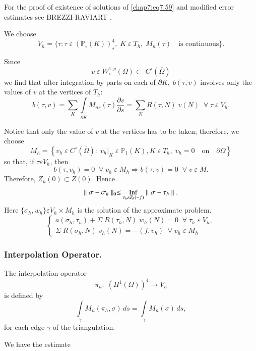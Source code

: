 For the proof of existence of solutions of \eqref{chap7:eq7.59} and
modified error estimates see BREZZI-RAVIART \cite{key7}.

We choose 
$$
V_h=\{\tau:\tau\;\varepsilon \;(\mathbb{P}_\circ(K))_s^4,\;K\;
\varepsilon \;T_h,\;M_n(\tau)\quad\text{is continuous}\}.
$$

Since
$$
v\;\varepsilon \;W_\circ^{1,p}(\Omega)\subset
\;C^\circ(\overline{\Omega})
$$
we find that after integration by parts on each of $\partial
K,\;b(\tau,v)$ involves only the values of $v$ at the vertices of
$T_h$:
\begin{equation*}\label{chap7:eq7.59b}
b(\tau,v)=\sum\limits_K\int\limits_{\partial K}M_{ns}(\tau)
\frac{\partial v}{\partial s}=\sum\limits_NR(\tau,N)\;v(N)\; \; \forall
\;\tau \;\varepsilon \;V_h.\tag{7.59b}
\end{equation*}

Notice that only the value of $v$ at the vertices has to be taken;
therefore, we choose
$$
M_h=\left\{v_h\;\varepsilon \;C^\circ(\overline{\Omega}):\;v_h|_K\;
\varepsilon \;\mathbb{P}_1(K),K\;\varepsilon \;T_h,\;v_h=0\quad
\text{on}\quad\partial\Omega\right\}
$$
so that, if $\tau \varepsilon V_h$, then 
$$
b(\tau,v_h)=0 \; \;\forall \;v_h\;\varepsilon \;M_h\Rightarrow b(\tau,v)=0
\; \;\forall \;v\;\varepsilon \;M.
$$
Therefore, $Z_h(0)\subset Z(0)$. Hence 
$$
\parallel\sigma -\sigma_h\parallel_0\leq \underset{\tau_h\varepsilon
Z_h(-f)}{\operatorname{Inf}}\parallel\sigma -\tau_h\parallel.
$$
Here $\{\sigma_h,w_h\}\varepsilon V_h\times M_h$ is the solution of
the approximate problem. 
\begin{equation}\label{chap7:eq7.60}
\begin{cases}
a(\sigma_h,\tau_h)+\Sigma \;R(\tau_h,N)\;w_h(N)=0\; \; \forall \;\tau_h
\;\varepsilon \;V_h,\\
\Sigma \;R(\sigma_h,N)\;v_h(N)=-(f,v_h)\; \; \forall \;v_h\;\varepsilon \;M_h
\end{cases}
\end{equation}\pageoriginale 

\subsubsection{\bf Interpolation Operator.} The interpolation operator 
$$
\pi_h:\;(H^1(\Omega))^4\to V_h
$$
is defined by
$$
\int\limits_\gamma M_n(\pi_h,\sigma)\,ds=\int\limits_\gamma
M_n(\sigma)\,ds,
$$
for each edge $\gamma$ of the triangulation. 

We have the estimate

